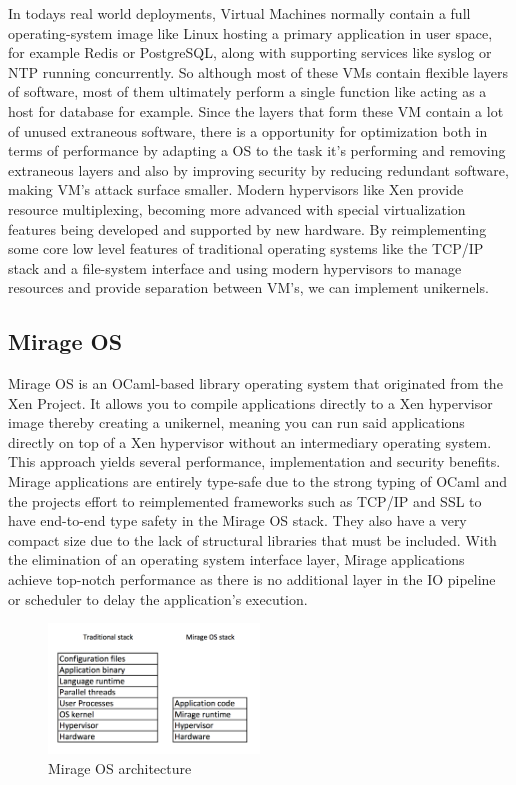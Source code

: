 \documentclass[english,10pt,twocolumn]{article}
\begin{document}
In todays real world deployments, Virtual Machines normally contain a full operating-system image like Linux hosting a primary application in user space, for example Redis or PostgreSQL, along with supporting services like syslog or NTP running concurrently.
So although most of these VMs contain flexible layers of software, most of them ultimately perform a single function like acting as a host for database for example.
Since the layers that form these VM contain a lot of unused extraneous software, there is a opportunity for optimization both in terms of performance by adapting a OS to the task it's performing and removing extraneous layers and also by improving security by reducing redundant software, making VM's attack surface smaller.
Modern hypervisors like Xen provide resource multiplexing, becoming more advanced with special virtualization features being developed and supported by new hardware.
By reimplementing some core low level features of traditional operating systems like the TCP/IP stack and a file-system interface and using modern hypervisors to manage resources and provide separation between VM's, we can implement unikernels.

\subsection{Mirage OS}

Mirage OS is an OCaml-based library operating system that originated from the Xen Project.
It allows you to compile applications directly to a Xen hypervisor image thereby creating a unikernel, meaning you can run said applications directly on top of a Xen hypervisor without an intermediary operating system.
This approach yields several performance, implementation and security benefits.
Mirage applications are entirely type-safe due to the strong typing of OCaml and the projects effort to reimplemented frameworks such as TCP/IP and SSL to have end-to-end type safety in the Mirage OS stack.
They also have a very compact size due to the lack of structural libraries that must be included.
With the elimination of an operating system interface layer, Mirage applications achieve top-notch performance as there is no additional layer in the IO pipeline or scheduler to delay the application's execution.

\begin{figure}[ht]
  \centering
  \caption{Mirage OS architecture}
  \includegraphics[width=0.5\textwidth]{images/design}
\end{figure}
\end{document}
